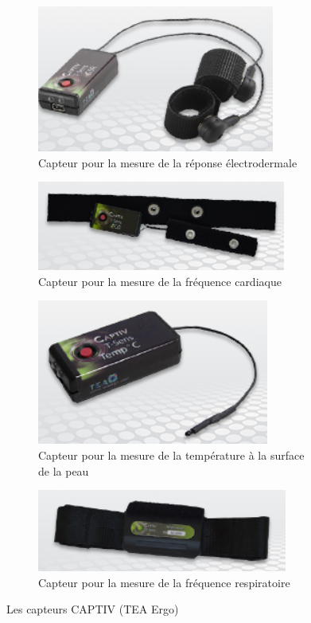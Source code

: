 \documentclass{article}
\begin{document}
			\begin{figure}
				\begin{subfigure}{0.5\textwidth}
					\centering
					\includegraphics[scale=0.5]{../include/TEAgsr.PNG}
					\caption{Capteur pour la mesure de la réponse électrodermale}
					\label{fig:gsr}
				\end{subfigure}
				\begin{subfigure}{0.5\textwidth}
					\centering
					\includegraphics[scale=0.5]{../include/TEAhr.PNG}
					\caption{Capteur pour la mesure de la fréquence cardiaque}
					\label{fig:hr}
				\end{subfigure}\newline
				\begin{subfigure}{0.5\textwidth}
					\centering
					\includegraphics[scale=0.5]{../include/TEAbt.PNG}
					\caption{Capteur pour la mesure de la température à la surface de la peau}
					\label{fig:bt}
				\end{subfigure}
				\begin{subfigure}{0.5\textwidth}
					\centering
					\includegraphics[scale=0.5]{../include/TEArr.PNG}
					\caption{Capteur pour la mesure de la fréquence respiratoire}
					\label{fig:rr}
				\end{subfigure}
				\caption{Les capteurs CAPTIV (TEA Ergo)}
				\label{fig:capteurstea}
			\end{figure}
\end{document}
